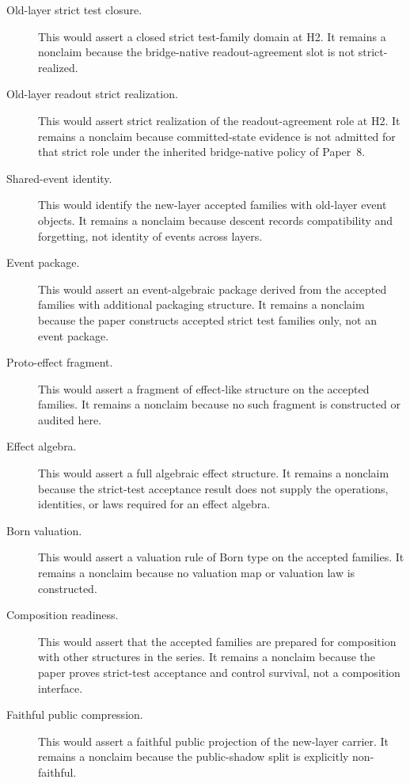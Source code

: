 \documentclass[11pt]{article}
\newcommand{\OldLayer}{H2}
\newcommand{\PaperEight}{Paper~8}
\theoremstyle{definition}
\begin{document}
\begin{description}
\item[Old-layer strict test closure.]
This would assert a closed strict test-family domain at \OldLayer{}.  It remains
a nonclaim because the bridge-native readout-agreement slot is not
strict-realized.

\item[Old-layer readout strict realization.]
This would assert strict realization of the readout-agreement role at
\OldLayer{}.  It remains a nonclaim because committed-state evidence is not
admitted for that strict role under the inherited bridge-native policy of
\PaperEight{}.

\item[Shared-event identity.]
This would identify the new-layer accepted families with old-layer event
objects.  It remains a nonclaim because descent records compatibility and
forgetting, not identity of events across layers.

\item[Event package.]
This would assert an event-algebraic package derived from the accepted families
with additional packaging structure.  It remains a nonclaim because the paper
constructs accepted strict test families only, not an event package.

\item[Proto-effect fragment.]
This would assert a fragment of effect-like structure on the accepted families.
It remains a nonclaim because no such fragment is constructed or audited here.

\item[Effect algebra.]
This would assert a full algebraic effect structure.  It remains a nonclaim
because the strict-test acceptance result does not supply the operations,
identities, or laws required for an effect algebra.

\item[Born valuation.]
This would assert a valuation rule of Born type on the accepted families.  It
remains a nonclaim because no valuation map or valuation law is constructed.

\item[Composition readiness.]
This would assert that the accepted families are prepared for composition with
other structures in the series.  It remains a nonclaim because the paper proves
strict-test acceptance and control survival, not a composition interface.

\item[Faithful public compression.]
This would assert a faithful public projection of the new-layer carrier.  It
remains a nonclaim because the public-shadow split is explicitly non-faithful.


\end{description}
\end{document}
